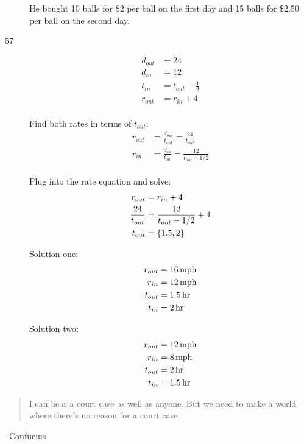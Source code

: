 \documentclass[letterpaper, landscape]{exam}
\begin{document}
\begin{description}
        He bought 10 balls for \$2 per ball on the first day and 15 balls for
        \$2.50 per ball on the second day.

      \item[57]
        \begin{align*}
          d_{out} & = 24 \\
          d_{in}  & = 12 \\
          t_{in}  & = t_{out} - \frac{1}{2} \\
          r_{out} & = r_{in} + 4 \\
        \end{align*}

        Find both rates in terms of $t_{out}$:
        \begin{align*}
          r_{out} & = \frac{d_{out}}{t_{out}} = \frac{24}{t_{out}}   \\
          r_{in}  & = \frac{d_{in}}{t_{in}} = \frac{12}{t_{out} - 1/2}  \\
        \end{align*}

        Plug into the rate equation and solve:
        \begin{align*}
          r_{out}                     & = r_{in} + 4 \\
          \frac{24}{t_{out}}          & = \frac{12}{t_{out} - 1/2} + 4 \\
          t_{out} &= \cbr{ 1.5, 2 } \\
        \end{align*}

        Solution one:
        \begin{align*}
          r_{out} & = \unit[16]{mph} \\
          r_{in}  & = \unit[12]{mph} \\
          t_{out} & = \unit[1.5]{hr} \\
          t_{in}  & = \unit[2]{hr} \\
        \end{align*}

        Solution two:
        \begin{align*}
          r_{out} & = \unit[12]{mph} \\
          r_{in}  & = \unit[8]{mph} \\
          t_{out} & = \unit[2]{hr} \\
          t_{in}  & = \unit[1.5]{hr} \\
        \end{align*}

    \end{description}

  \fi
  \ifprintanswers{}
  \else
    \vspace{8 cm}
    \begin{quote}
      \begin{em}
        I can hear a court case as well as anyone.  But we need to make a world
        where there's no reason for a court case.
      \end{em}
    \end{quote}
    \hspace{2 cm}--Confucius
  \fi
\end{document}
